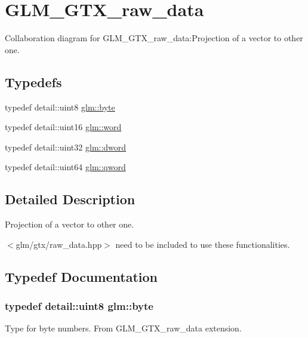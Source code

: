 \hypertarget{group__gtx__raw__data}{
\section{GLM\_\-GTX\_\-raw\_\-data}
\label{group__gtx__raw__data}
}


Collaboration diagram for GLM\_\-GTX\_\-raw\_\-data:Projection of a vector to other one.  
\subsection*{Typedefs}
\begin{CompactItemize}
\item 
typedef detail::uint8 \hyperlink{group__gtx__raw__data_gcd7fe1f2ad60a57f7d7ad4f1e6836efd}{glm::byte}
\item 
typedef detail::uint16 \hyperlink{group__gtx__raw__data_g5617a479d471021b5c773c5e969ba46d}{glm::word}
\item 
typedef detail::uint32 \hyperlink{group__gtx__raw__data_g1fc2589df6d44e923cd1820cf14805cf}{glm::dword}
\item 
typedef detail::uint64 \hyperlink{group__gtx__raw__data_g32447af289e879589883c9b7e3be1246}{glm::qword}
\end{CompactItemize}


\subsection{Detailed Description}
Projection of a vector to other one. 

$<$glm/gtx/raw\_\-data.hpp$>$ need to be included to use these functionalities. 

\subsection{Typedef Documentation}
\hypertarget{group__gtx__raw__data_gcd7fe1f2ad60a57f7d7ad4f1e6836efd}{
\subsubsection[byte]{\setlength{\rightskip}{0pt plus 5cm}typedef detail::uint8 {\bf glm::byte}}}
\label{group__gtx__raw__data_gcd7fe1f2ad60a57f7d7ad4f1e6836efd}


Type for byte numbers. From GLM\_\-GTX\_\-raw\_\-data extension. 

